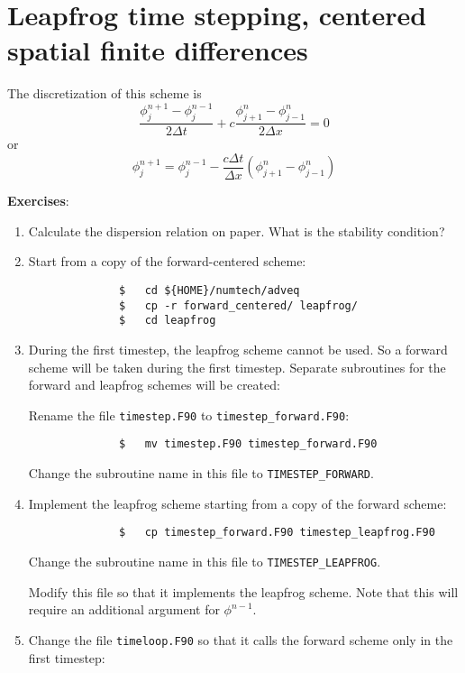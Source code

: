 \documentclass[a4paper]{article}
\begin{document}
\section{Leapfrog time stepping, centered spatial finite differences}
%
\par
The discretization of this scheme is
%
\begin{equation*}
	\frac{\phi^{n+1}_j-\phi^{n-1}_j}{2\Delta t}+c\frac{\phi^{n}_{j+1}-\phi^{n}_{j-1}}{2\Delta x}=0
\end{equation*}
%
or
%
\begin{equation*}
	\phi^{n+1}_j=\phi^{n-1}_j-\frac{c\Delta t}{\Delta x}\left(\phi^{n}_{j+1}-\phi^{n}_{j-1}\right)
\end{equation*}
%
\par\vspace*{3ex}
\textbf{Exercises}:
%
\begin{enumerate}
	\item Calculate the dispersion relation on paper. What is the stability condition?
	\item Start from a copy of the forward-centered scheme:
		\begin{verbatim}
			  $   cd ${HOME}/numtech/adveq
			  $   cp -r forward_centered/ leapfrog/
			  $   cd leapfrog
		\end{verbatim}
	\item During the first timestep, the leapfrog scheme cannot be used. So a forward scheme will be taken during the first timestep. Separate subroutines for the forward and leapfrog schemes will be created:
		\par
		Rename the file \verb+timestep.F90+ to \verb+timestep_forward.F90+:
		\begin{verbatim}
			  $   mv timestep.F90 timestep_forward.F90
		\end{verbatim}
		Change the subroutine name in this file to \verb+TIMESTEP_FORWARD+.
	\item Implement the leapfrog scheme starting from a copy of the forward scheme:
		\begin{verbatim}
			  $   cp timestep_forward.F90 timestep_leapfrog.F90
		\end{verbatim}		
		Change the subroutine name in this file to \verb+TIMESTEP_LEAPFROG+.
		\par
		Modify this file so that it implements the leapfrog scheme. Note that this will require an additional argument for $\phi^{n-1}$.
	\item Change the file \verb+timeloop.F90+	so that it calls the forward scheme only in the first timestep:
	

\end{enumerate}
\end{document}
